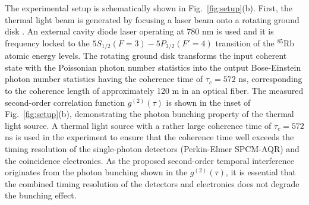 \documentclass[aps,prl,reprint,showpacs,superscriptaddress]{revtex4-1}
\begin{document}






The  experimental setup is schematically shown in Fig.~\ref{fig:setup}(b). First, the thermal light beam is generated by focusing a laser beam onto a rotating ground disk \cite{Cho10a,Cho10b}. An external cavity diode laser operating at 780 nm is used and it is frequency locked to the  $5S_{1/2}(F=3) - 5P_{3/2}(F'=4)$ transition of the $^{85}$Rb atomic energy levels. The rotating ground disk transforms the input coherent state with the Poissonian photon number statistics into the output Bose-Einstein photon number statistics having the coherence time of $\tau_c=572$ ns, corresponding to the coherence length of approximately 120 m in an optical fiber. The measured second-order correlation function  $g^{(2)}(\tau)$ is shown in the inset of Fig.~\ref{fig:setup}(b), demonstrating the photon bunching property  of the thermal light source. A thermal light source with a rather large coherence time of $\tau_c=572$ ns is used in the experiment to ensure that the coherence time well exceeds the timing resolution of the single-photon detectors (Perkin-Elmer SPCM-AQR) and the coincidence electronics. As the proposed second-order temporal interference originates from the photon bunching shown in the $g^{(2)}(\tau)$, it is essential that the combined timing resolution of the detectors and electronics does not degrade the bunching effect.   
\end{document}
